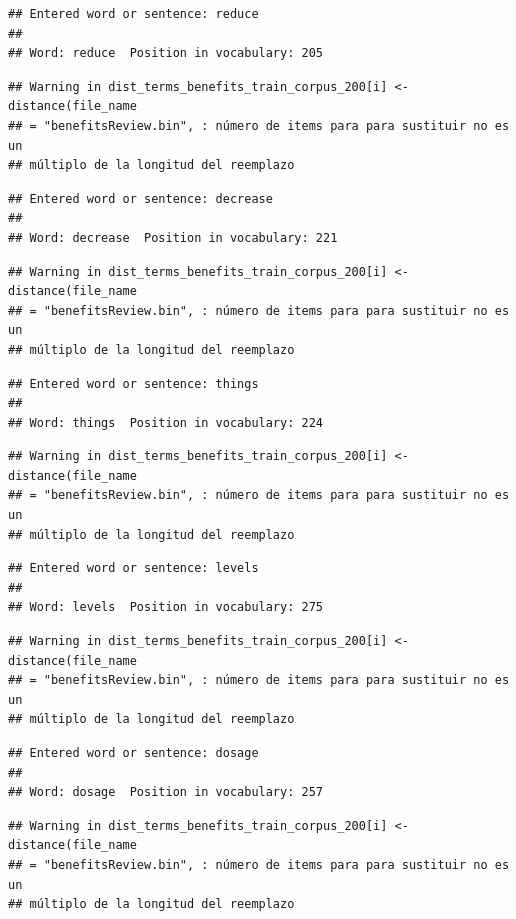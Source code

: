 \documentclass[spanish,]{article}
\begin{document}
\begin{verbatim}
## Entered word or sentence: reduce
## 
## Word: reduce  Position in vocabulary: 205
\end{verbatim}

\begin{verbatim}
## Warning in dist_terms_benefits_train_corpus_200[i] <- distance(file_name
## = "benefitsReview.bin", : número de items para para sustituir no es un
## múltiplo de la longitud del reemplazo
\end{verbatim}

\begin{verbatim}
## Entered word or sentence: decrease
## 
## Word: decrease  Position in vocabulary: 221
\end{verbatim}

\begin{verbatim}
## Warning in dist_terms_benefits_train_corpus_200[i] <- distance(file_name
## = "benefitsReview.bin", : número de items para para sustituir no es un
## múltiplo de la longitud del reemplazo
\end{verbatim}

\begin{verbatim}
## Entered word or sentence: things
## 
## Word: things  Position in vocabulary: 224
\end{verbatim}

\begin{verbatim}
## Warning in dist_terms_benefits_train_corpus_200[i] <- distance(file_name
## = "benefitsReview.bin", : número de items para para sustituir no es un
## múltiplo de la longitud del reemplazo
\end{verbatim}

\begin{verbatim}
## Entered word or sentence: levels
## 
## Word: levels  Position in vocabulary: 275
\end{verbatim}

\begin{verbatim}
## Warning in dist_terms_benefits_train_corpus_200[i] <- distance(file_name
## = "benefitsReview.bin", : número de items para para sustituir no es un
## múltiplo de la longitud del reemplazo
\end{verbatim}

\begin{verbatim}
## Entered word or sentence: dosage
## 
## Word: dosage  Position in vocabulary: 257
\end{verbatim}

\begin{verbatim}
## Warning in dist_terms_benefits_train_corpus_200[i] <- distance(file_name
## = "benefitsReview.bin", : número de items para para sustituir no es un
## múltiplo de la longitud del reemplazo
\end{verbatim}
\end{document}
